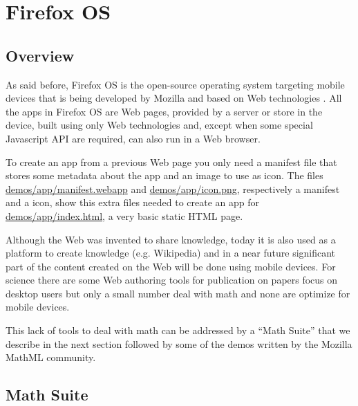 \section{Firefox OS}
\label{sec:firefoxOS}

\subsection{Overview}

As said before,
Firefox OS is the open-source operating system targeting mobile devices that
is being
developed by Mozilla and based on Web technologies \cite{MozillaFirefoxOS}.
All the apps in Firefox OS
are Web pages, provided by a server or store in the device, built using only Web
technologies and, except when
some special Javascript API are required, can also run in a Web browser.

To create an app from a previous Web page you only need a manifest
file that stores some metadata about the app and an image to use as icon. The
files
\href{http://fred-wang.github.io/MathUI2014/demos/app/manifest.webapp}{demos/app/manifest.webapp}
and
\href{http://fred-wang.github.io/MathUI2014/demos/app/icon.png}{demos/app/icon.png},
respectively a manifest and a icon,
show this extra files needed to create an app for
\href{http://fred-wang.github.io/MathUI2014/demos/app/index.html}{demos/app/index.html},
a very basic static HTML page.

Although the Web was invented to share knowledge, today it is also used
as a platform to create knowledge (e.g. Wikipedia) and in a near future
significant part of the content created on the Web will be done using mobile
devices. For science there are some Web authoring tools for publication on
papers focus on desktop users but only a small number deal with math and none
are optimize for mobile devices.

This lack of tools to deal with math can be addressed by a ``Math Suite'' that
we describe in the next section followed by some of the demos written by the
Mozilla MathML community.

\subsection{Math Suite}


